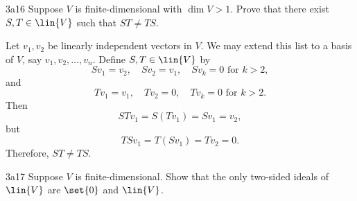 \begin{exercise}{3a16}
    Suppose $V$ is finite-dimensional with $\dim V > 1$.
	Prove that there exist $S, T \in \lin{V}$ such that $ST \neq TS$.
\end{exercise}

\begin{sol}
    Let $v_1, v_2$ be linearly independent vectors in $V$.
	We may extend this list to a basis of $V$, say $v_1, v_2, \ldots, v_n$.
	Define $S, T \in \lin{V}$ by
    \[
    	Sv_1 = v_2, \quad Sv_2 = v_1, \quad Sv_k = 0 \text{ for } k > 2,
    \]
    and
    \[
    	Tv_1 = v_1, \quad Tv_2 = 0, \quad Tv_k = 0 \text{ for } k > 2.
    \]
    Then
    \[
    	STv_1 = S(Tv_1) = Sv_1 = v_2,
    \]
    but
    \[
    	TSv_1 = T(Sv_1) = Tv_2 = 0.
    \]
    Therefore, $ST \neq TS$.
\end{sol}

\begin{exercise}{3a17}
    Suppose $V$ is finite-dimensional.
	Show that the only two-sided ideals of $\lin{V}$ are $\set{0}$ and $\lin{V}$.
    
\end{exercise}

